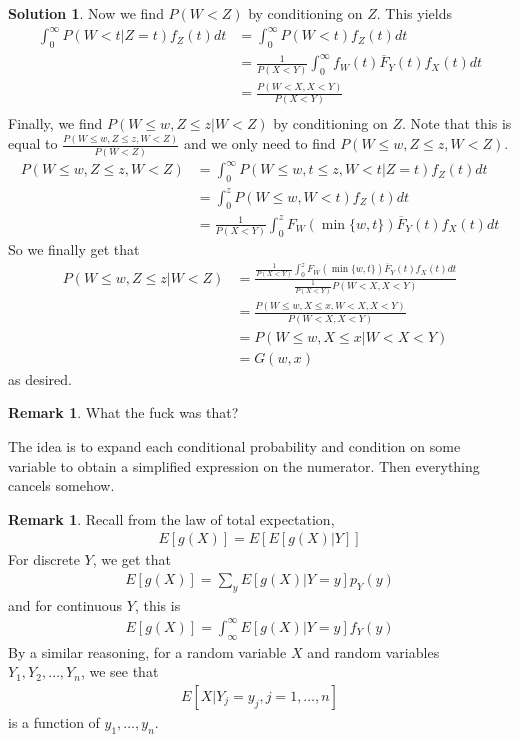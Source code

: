 \documentclass[11pt]{amsart}
\theoremstyle{definition}
\newtheorem{remark}[theorem]{Remark}
\newtheorem{solution}[theorem]{Solution}
\numberwithin{equation}{section}
\begin{document}
\begin{solution}
     Now we find $P(W<Z)$ by conditioning on $Z$. This yields
     \begin{align*}
         \int_0^\infty P(W<t|Z=t)f_Z(t)dt&=\int_0^\infty P(W<t)f_Z(t)dt\\
         &=\frac{1}{P(X<Y)}\int_0^\infty f_W(t)\overline{F}_Y(t)f_X(t)dt\\
         &=\frac{P(W<X, X<Y)}{P(X<Y)}\\
     \end{align*}
     Finally, we find $P(W\le w, Z\le z|W<Z)$ by conditioning on $Z$. Note that this is equal to $\displaystyle\frac{P(W\le w, Z\le z, W<Z)}{P(W<Z)}$ and we only need to find $P(W\le w, Z\le z, W<Z)$.
     \begin{align*}
         P(W\le w, Z\le z, W<Z)&=\int_0^\infty P(W\le w, t\le z, W<t|Z=t)f_Z(t)dt\\
         &=\int_0^z P(W\le w, W<t)f_Z(t)dt\\
         &=\frac{1}{P(X<Y)}\int_0^z F_W(\min\{w,t\})\overline{F}_Y(t)f_X(t)dt
     \end{align*}
     So we finally get that
     \begin{align*}
         P(W\le w, Z\le z|W<Z)&=\frac{\frac{1}{P(X<Y)}\int_0^zF_W(\min\{w,t\})\overline{F}_Y(t)f_X(t)dt}{\frac{1}{P(X<Y)}P(W<X, X<Y)}\\
         &=\frac{P(W\le w, X\le x, W<X, X<Y)}{P(W<X, X<Y)}\\
         &=P(W\le w, X\le x|W<X<Y)\\
         &=G(w, x)
     \end{align*}
     as desired.
 \end{solution}
 \begin{remark}
     What the fuck was that?

     The idea is to expand each conditional probability and condition on some variable to obtain a simplified expression on the numerator. Then everything cancels somehow.
 \end{remark}
 \begin{remark}
     Recall from the law of total expectation, 
     \begin{align*}
         E[g(X)]=E[E[g(X)|Y]]
     \end{align*}
     For discrete $Y$, we get that
     \begin{align*}
         E[g(X)]=\sum_{y}E[g(X)|Y=y]p_Y(y)
     \end{align*}
     and for continuous $Y$, this is
     \begin{align*}
         E[g(X)]=\int_{\infty}^\infty E[g(X)|Y=y]f_Y(y)
     \end{align*}
     By a similar reasoning, for a random variable $X$ and random variables $Y_1, Y_2,\ldots,Y_n$, we see that
     \begin{align*}
         E[X|Y_j=y_j, j=1,\ldots,n]
     \end{align*}
     is a function of $y_1,\ldots,y_n$.
 \end{remark}
\end{document}
